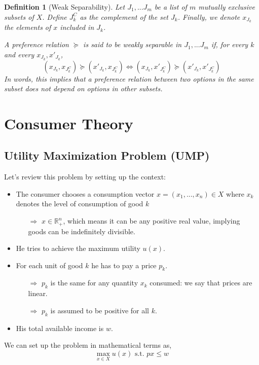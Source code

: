 \documentclass[12pt]{report}
\newtheorem{definition}{Definition}[chapter]
\begin{document}
\begin{definition}[Weak Separability]
Let $J_1,...J_m$ be a list of $m$ mutually exclusive subsets of $X$. Define $J_k^C$ as the complement of the set $J_k$. Finally, we denote $x_{J_k}$ the elements of $x$ included in $J_k$.

A preference relation $\succeq$ is said to be weakly separable in $J_1, ... J_m$ if, for every $k$ and every $x_{J_k}, x'_{J_k}$, $$(x_{J_k},x_{J_k^C})\succeq (x'_{J_k},x_{J_k^C}) \Leftrightarrow (x_{J_k},x'_{J_k^C})\succeq (x'_{J_k},x'_{J_k^C}) $$ In words, this implies that a preference relation between two options in the same subset does not depend on options in other subsets.
\end{definition}

\chapter{Consumer Theory}

\section{Utility Maximization Problem (UMP)}

Let's review this problem by setting up the context:\begin{itemize}
\item The consumer chooses a consumption vector $x = (x_1, ..., x_n)\in X$ where $x_k$ denotes the level of consumption of good $k$\begin{itemize}
\item[$\Rightarrow$] $x\in\mathbb{R}_{+}^n$, which means it can be any positive real value, implying goods can be indefinitely divisible.
\end{itemize}
\item He tries to achieve the maximum utility $u(x)$.
\item For each unit of good $k$ he has to pay a price $p_k$.\begin{itemize}
\item[$\Rightarrow$] $p_k$ is the same for any quantity $x_k$ consumed: we say that prices are linear.
\item[$\Rightarrow$] $p_k$ is assumed to be positive for all $k$.
\end{itemize}
\item His total available income is $w$.
\end{itemize} 
We can set up the problem in mathematical terms as,$$\max_{x\in X} u(x) \text{ s.t. } px \leq w $$
\end{document}
